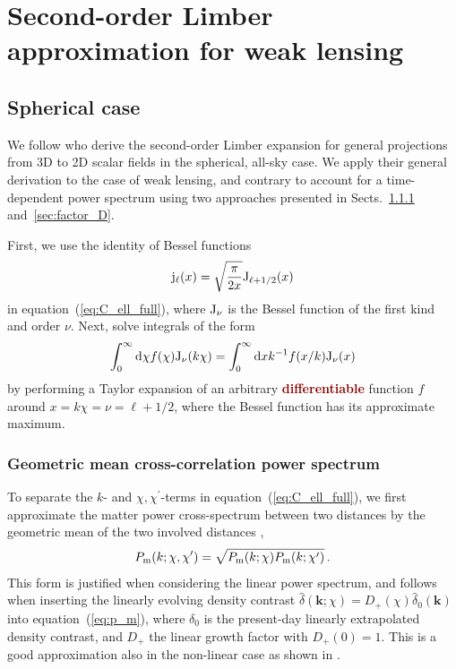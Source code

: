 \documentclass[fleqn,usenatbib]{mnras} %
\renewcommand{\vec}{\bm}
\newcommand{\forref}[1]{{\bf\textcolor{darkred}{#1}}}
\begin{document}
\section{Second-order Limber approximation for weak lensing}
\label{sec:L2}

\subsection{Spherical case}

We follow \cite{2008PhRvD..78l3506L} who derive the second-order Limber
expansion for general projections from 3D to 2D scalar fields in the spherical,
all-sky case. We apply their general derivation to the case of weak lensing,
and contrary to \cite{2008PhRvD..78l3506L} account for a time-dependent power
spectrum using two approaches presented in Sects.~\ref{sec:geom_mean} and~\ref{sec:factor_D}.

First, we use the identity of Bessel functions
%
\begin{equation}
  {\rm j}_\ell(x) = \sqrt{\frac{\pi}{2x}} {\rm J}_{\ell + 1/2}(x)
  \label{eq:jJ}
\end{equation}
%
in equation~(\ref{eq:C_ell_full}), where ${\rm J}_\nu$ is the Bessel function of the first kind
and order $\nu$. Next, \cite{2008PhRvD..78l3506L} solve integrals of
the form
%
\begin{equation}
  \int_0^\infty {\rm d} \chi f(\chi) {\rm J}_\nu(k \chi)
  = \int_0^\infty {\rm d} x k^{-1} f(x/k) {\rm J}_\nu(x)
  \label{eq:int_dchi}
\end{equation}
%
by performing a Taylor expansion of an arbitrary \forref{differentiable} function
$f$ around $x = k \chi = \nu = \ell + 1/2$, where the Bessel function has its
approximate maximum.

\subsubsection{Geometric mean cross-correlation power spectrum}
\label{sec:geom_mean}

To separate the $k$- and $\chi, \chi^\prime$-terms in
equation~(\ref{eq:C_ell_full}), we first approximate the matter power
cross-spectrum between two distances by the geometric mean of the two involved
distances \citep{2005PhRvD..72b3516C,2016arXiv161200770K},
%
\begin{equation}
 P_{\rm m}(k; \chi, \chi^\prime) = \sqrt{ P_{\rm m}(k; \chi) P_{\rm m}(k; \chi^\prime) } \, .
  \label{eq:P_geom_mean}
\end{equation}
%
This form is justified when considering the linear power spectrum, and
follows when inserting the linearly evolving density contrast $\hat \delta(\vec
k; \chi) = D_+(\chi) \hat \delta_0(\vec k)$ into equation~(\ref{eq:p_m}), where
$\delta_0$ is the present-day linearly extrapolated density contrast, and $D_+$
the linear growth factor with $D_+(0) = 1$. This is a good approximation
also in the non-linear case as shown in \cite{2016arXiv161200770K}.
\end{document}

